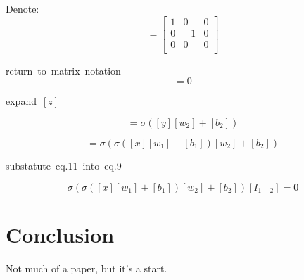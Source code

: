 \documentclass{article}
\begin{document}
\hbox{Denote: }
\begin{equation}
    [I_{1-2}] = \begin{bmatrix}   
        1 & 0 & 0 \\
        0 & -1 & 0 \\
        0 & 0 & 0 \\
        \end{bmatrix}
\end{equation}

\hbox{return to matrix notation}
\begin{equation}
    [z][I_{1-2}] = 0
\end{equation}


\hbox{expand $[z]$}

\begin{equation}
    [z] = \sigma([y][w_2] + [b_2])
\end{equation}

\begin{equation}
    [z] = \sigma(
            \sigma([x][w_1] + [b_1])
        [w_2] + [b_2])
\end{equation}

\hbox{substatute eq.11 into eq.9}

\begin{equation}
    \sigma(
            \sigma([x][w_1] + [b_1])
        [w_2] + [b_2])[I_{1-2}] = 0
\end{equation}






\section{Conclusion}
Not much of a paper, but it's a start.
\end{document}
